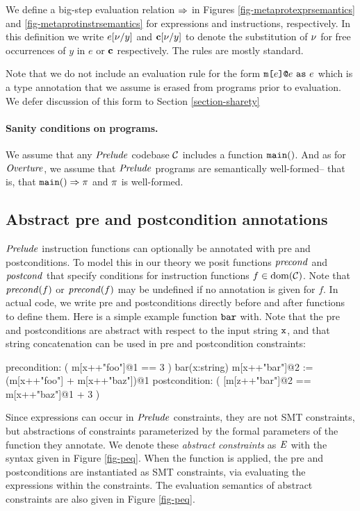 \metaprotexprsemanticsfig

We define a big-step evaluation relation $\Rightarrow$ in Figures
\ref{fig-metaprotexprsemantics} and \ref{fig-metaprotinstrsemantics}
for expressions and instructions, respectively.  In this definition we
write $e[\nu/y]$ and $\mathbf{c}[\nu/y]$ to denote the substitution of
$\nu$ for free occurrences of $y$ in $e$ or $\mathbf{c}$ respectively. The
rules are mostly standard.

Note that we do not include an evaluation
rule for the form $\texttt{m[}e\texttt{]}\texttt{@}e\ \texttt{as}\ e$ which is a type
annotation that we assume is erased from programs prior to
evaluation. We defer discussion of this form to Section
\ref{section-sharety}

\paragraph{Sanity conditions on programs.} We assume that
any $\mathit{Prelude}$ codebase $\mathcal{C}$ includes a function
$\texttt{main}()$. And as for $\mathit{Overture}$, we assume that $\mathit{Prelude}$
programs are semantically well-formed-- that is, that
$\texttt{main}() \Rightarrow \pi$ and $\pi$ is well-formed.

\metaprotinstrsemanticsfig

\subsection{Abstract pre and postcondition annotations}

$\mathit{Prelude}$ instruction functions can optionally be annotated with
pre and postconditions. To model this in our theory we posit
functions $\mathit{precond}$  and $\mathit{postcond}$ 
that specify conditions for instruction functions $f \in \mathrm{dom}(\mathcal{C})$.
Note that $\mathit{precond}(f)$ or $\mathit{precond}(f)$ may be undefined if no annotation
is given for $f$. In actual code, we write pre and postconditions directly before and
after functions to define them. Here is a simple example function $\texttt{bar}$
with. Note that the pre and postconditions are abstract with respect to the
input string $\texttt{x}$, and that string concatenation  
can be used in pre and postcondition constraints:
\begin{verbatimtab}
precondition: ( m[x++"foo"]@1 == 3 )
bar(x:string){ m[x++"bar"]@2 := (m[x++"foo"] + m[x++"baz"])@1 }
postcondition: ( [m[z++"bar"]@2 == m[x++"baz"]@1 + 3 )
\end{verbatimtab}
Since expressions can occur in $\mathit{Prelude}$ constraints, they are not
SMT constraints, but abstractions of constraints parameterized by
the formal parameters of the function they annotate. We denote these
\emph{abstract constraints} as $\mathit{E}$ with the syntax given
in Figure \ref{fig-peq}. When the function is applied, the pre and postconditions
are instantiated as SMT constraints, via evaluating the expressions
within the constraints. The evaluation semantics of abstract constraints
are also given in Figure \ref{fig-peq}.


